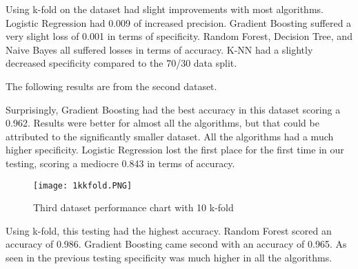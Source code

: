 \documentclass[conference]{IEEEtran}
\begin{document}
 
    
    
    
    Using k-fold on the dataset had slight improvements with most algorithms. Logistic Regression had 0.009 of increased precision. Gradient Boosting suffered a very slight loss of 0.001 in terms of specificity. Random Forest, Decision Tree, and Naive Bayes all suffered losses in terms of accuracy. K-NN had a slightly decreased specificity compared to the 70/30 data split.\newline
    
    The following results are from the second dataset.
  




Surprisingly, Gradient Boosting had the best accuracy in this dataset scoring a 0.962. Results were better for almost all the algorithms, but that could be attributed to the significantly smaller dataset. All the algorithms had a much higher specificity. Logistic Regression lost the first place for the first time in our testing, scoring a mediocre 0.843 in terms of accuracy.

\begin{table}[H]
\caption{Statistics of Algorithms with 10 k-fold }
\label{kfold}
\end{table}

\begin{figure}[H]
\texttt{[image: 1kkfold.PNG]}
\caption{Third dataset performance chart with 10 k-fold}
\label{chart} 
\end{figure}

Using k-fold, this testing had the highest accuracy. Random Forest scored an accuracy of 0.986. Gradient Boosting came second with an accuracy of 0.965. As seen in the previous testing specificity was much higher in all the algorithms.
\end{document}

